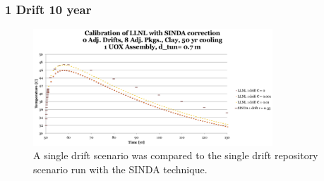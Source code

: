 \begin{frame}[ctb!]

  \frametitle{1 Drift 10 year}
  \begin{figure}[h!]
    \begin{center}
      \includegraphics[width=0.8\textwidth]{1drift50yr.eps}
    \end{center}
    \caption{A single drift scenario was compared to the single drift repository 
    scenario run with the SINDA technique.}
    \label{fig:1drift50yr}
  \end{figure}
  
\end{frame}


